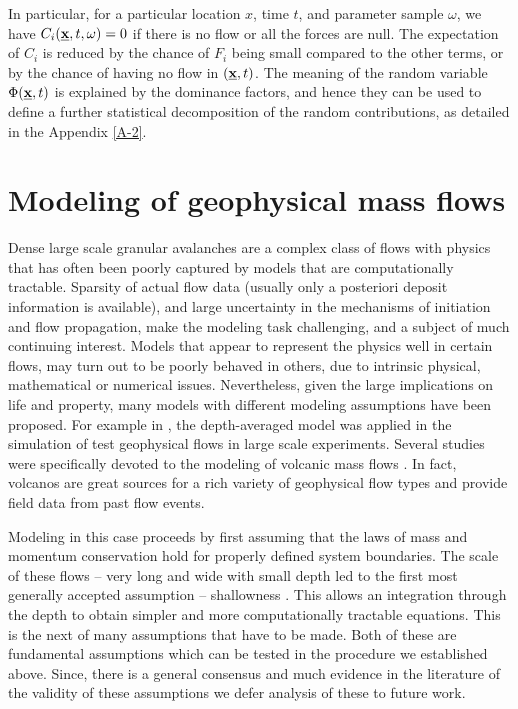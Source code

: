 \documentclass{article}
\begin{document}
In particular, for a particular location $x$, time $t$, and parameter sample $\omega$, we have $C_i(\underline{\textbf x},t,\omega)=0$ if there is no flow or all the forces are null. The expectation of $C_i$ is reduced by the chance of $F_i$ being small compared to the other terms, or by the chance of having no flow in $(\underline{\textbf x},t)$. The meaning of the random variable $\Phi(\underline{\textbf x},t)$ is explained by the dominance factors, and hence they can be used to define a further statistical decomposition of the random contributions, as detailed in the Appendix \ref{A-2}.


\section{Modeling of geophysical mass flows}\label{subsec:FlowTypes}
Dense large scale granular avalanches are a complex class of flows with physics that has often been poorly captured by models that are computationally tractable. Sparsity of actual flow data (usually only a posteriori deposit information is available), and large uncertainty in the mechanisms of initiation and flow propagation, make the modeling task challenging, and a subject of much continuing interest. Models that appear to represent the physics well in certain flows, may turn out to be poorly behaved in others, due to intrinsic physical, mathematical or numerical issues. Nevertheless, given the large implications on life and property, many models with different modeling assumptions have been proposed. For example in \citep{Iverson1997, Iverson2001, Denlinger2001, Pitman2003a, Denlinger2004, Iverson2004}, the depth-averaged model was applied in the simulation of test geophysical flows in large scale experiments. Several studies were specifically devoted to the modeling of volcanic mass flows \citep{Bursik2005,Kelfoun2005,Macias2008,Kelfoun2009,Charbonnier2013}. In fact, volcanos are great sources for a rich variety of geophysical flow types and provide field data from past flow events.

Modeling in this case proceeds by first assuming that the laws of mass and momentum conservation hold for properly defined system boundaries. The scale of these flows -- very long and wide with small depth led to the first most generally accepted assumption -- shallowness \citep{SavageHutter1989}. This allows an integration through the depth to obtain simpler and more computationally tractable equations. This is the next of many assumptions that have to be made. Both of these are fundamental assumptions which can be tested in the procedure we established above. Since, there is a general consensus and much evidence in the literature of the validity of these assumptions we defer analysis of these to future work.
\end{document}
